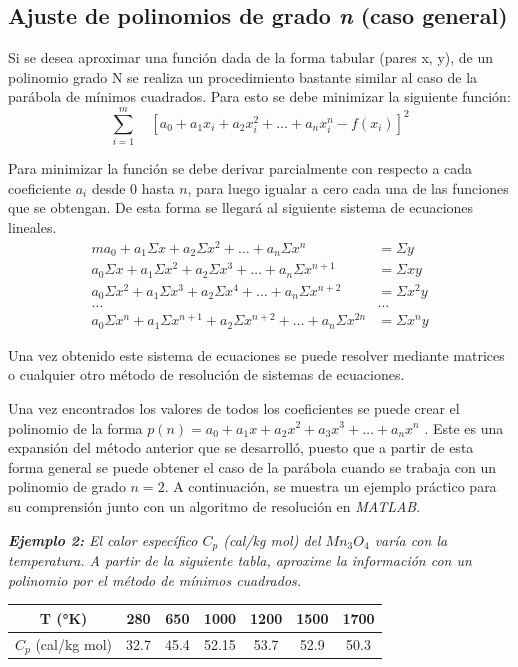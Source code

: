 \documentclass[11pt,letterpaper]{article}
\begin{document}
\subsection{Ajuste de polinomios de grado \textit{n}	 (caso general)}
Si se desea aproximar una función dada de la forma tabular (pares x, y), de un polinomio grado N se realiza un procedimiento bastante similar al caso de la parábola de mínimos cuadrados. Para esto se debe minimizar la siguiente función:
\begin{equation} \label{	equation:ajustte}
	\sum_{i=1}^{m} \quad [ a_0 + a_1x_i + a_2x_i^2 + \dots + a_nx_i^n - f(x_i)] ^ 2
\end{equation}
\par
Para minimizar la función se debe derivar parcialmente con respecto a cada coeficiente $a_i$ desde 0 hasta $n$, para luego igualar a cero cada una de las funciones que se obtengan. De esta forma se llegará al siguiente sistema de ecuaciones lineales.
\begin{align*}
	ma_0 + a_1\Sigma x + a_2\Sigma x^2 + \dots + a_n\Sigma x^n &= \Sigma y \\
	a_0\Sigma x + a_1\Sigma x^2 + a_2\Sigma x^3 + \dots + a_n\Sigma x^{n+1} &= \Sigma xy\\
	a_0\Sigma x ^2 + a_1\Sigma x^3 + a_2\Sigma x^4 + \dots + a_n\Sigma x^{n+2} &= \Sigma x^2y \\
	\dots  & \dots \\
	a_0\Sigma x^n + a_1\Sigma x^{n+1} + a_2\Sigma x^{n+2} + \dots + a_n\Sigma x^{2n} &= \Sigma  x^ny
\end{align*}
\par
Una vez obtenido este sistema de ecuaciones se puede resolver mediante matrices o cualquier otro método de resolución de sistemas de ecuaciones.
\par  Una vez encontrados los valores de todos los coeficientes se puede crear el polinomio de la forma  $p(n) = a_0 + a_1x + a_2x^2 + a_3x^3 + \dots + a_nx^n$ . Este es una expansión del método anterior que se desarrolló, puesto que a partir de esta forma general se puede obtener el caso de la parábola cuando se trabaja con un polinomio de grado $n = 2$.\cite{nieves2011metodos} A continuación, se muestra un ejemplo práctico para su comprensión junto con un algoritmo de resolución en \textit{MATLAB}.
\begin{center}
\textit{\textbf{Ejemplo 2:} El calor específico $C_p$ (cal/kg mol) del $Mn_3O_4$ varía con la temperatura. A partir de la siguiente tabla, aproxime la información con un polinomio por el método de mínimos cuadrados.} \cite{nieves2011metodos}
\linebreak \par
	\begin{tabular}{c|c c c c c c}
	\hline 
	T (°K) & 280 & 650 & 1000 & 1200 & 1500 & 1700 \\ \hline
	$C_p$ (cal/kg mol) & 32.7 & 45.4 & 52.15 & 53.7 & 52.9 & 50.3 \\ 
	\hline 
	\end{tabular} 
\end{center}
\end{document}
